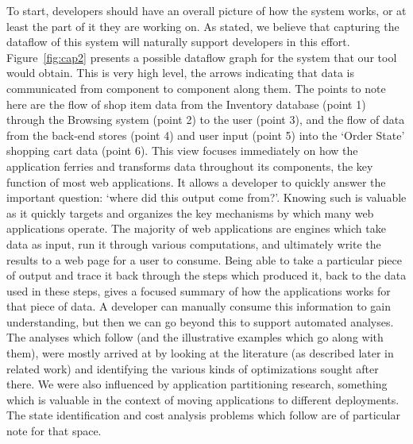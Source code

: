 \documentclass[msc,oneside]{ubcthesis}
\begin{document}
To start, developers should have an overall picture of how the system works, or at least the part of it they are working on. As stated, we believe that capturing the dataflow of this system will naturally support developers in this effort. Figure~\ref{fig:cap2} presents a possible dataflow graph for the system that our tool would obtain. This is very high level, the arrows indicating that data is communicated from component to component along them. The points to note here are the flow of shop item data from the Inventory database (point 1) through the Browsing system (point 2) to the user (point 3), and the flow of data from the back-end stores (point 4) and user input (point 5) into the `Order State' shopping cart data (point 6). This view focuses immediately on how the application ferries and transforms data throughout its components, the key function of most web applications. It allows a developer to quickly answer the important question: `where did this output come from?'. Knowing such is valuable as it quickly targets and organizes the key mechanisms by which many web applications operate. The majority of web applications are engines which take data as input, run it through various computations, and ultimately write the results to a web page for a user to consume. Being able to take a particular piece of output and trace it back through the steps which produced it, back to the data used in these steps, gives a focused summary of how the applications works for that piece of data. A developer can manually consume this information to gain understanding, but then we can go beyond this to support automated analyses. \\

The analyses which follow (and the illustrative examples which go along with them), were mostly arrived at by looking at the literature (as described later in related work) and identifying the various kinds of optimizations sought after there. We were also influenced by application partitioning research, something which is valuable in the context of moving applications to different deployments. The state identification and cost analysis problems which follow are of particular note for that space.
\end{document}
